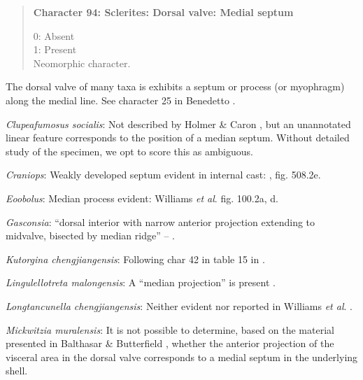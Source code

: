 \documentclass[openany]{book}
\theoremstyle{definition}
\theoremstyle{definition}
\theoremstyle{definition}
\theoremstyle{remark}
\begin{document}
\begin{quote}
\textbf{Character 94: Sclerites: Dorsal valve: Medial septum}

0: Absent\\
1: Present\\
Neomorphic character.
\end{quote}

The dorsal valve of many taxa is exhibits a septum or process (or
myophragm) along the medial line. See character 25 in Benedetto
\citeyearpar{Benedetto2009iChaniella}.

\hypertarget{Clupeafumosus_socialis-coding-94}{}
\emph{Clupeafumosus socialis}: Not described by Holmer \& Caron
\citeyearpar{Holmer2006Aspinose}, but an unannotated linear feature
corresponds to the position of a median septum. Without detailed study
of the specimen, we opt to score this as ambiguous.

\hypertarget{Craniops-coding-94}{}
\emph{Craniops}: Weakly developed septum evident in internal cast:
\citet{Williams2000LinguliformeaCraniiformea}, fig. 508.2e.

\hypertarget{Eoobolus-coding-94}{}
\emph{Eoobolus}: Median process evident: Williams \emph{et al}.
\citeyearpar{Williams2000LinguliformeaCraniiformea} fig. 100.2a, d.

\hypertarget{Gasconsia-coding-94}{}
\emph{Gasconsia}: ``dorsal interior with narrow anterior projection
extending to midvalve, bisected by median ridge'' --
\citet{Williams2000LinguliformeaCraniiformea}.

\hypertarget{Kutorgina_chengjiangensis-coding-94}{}
\emph{Kutorgina chengjiangensis}: Following char 42 in table 15 in
\citet{Williams2000LinguliformeaCraniiformea}.

\hypertarget{Lingulellotreta_malongensis-coding-94}{}
\emph{Lingulellotreta malongensis}: A ``median projection'' is present
\citep[fig. 4g in][]{Balthasar2009Thebrachiopod}.

\hypertarget{Longtancunella_chengjiangensis-coding-94}{}
\emph{Longtancunella chengjiangensis}: Neither evident nor reported in
Williams \emph{et al}.
\citeyearpar{Williams2000LinguliformeaCraniiformea}.

\hypertarget{Mickwitzia_muralensis-coding-94}{}
\emph{Mickwitzia muralensis}: It is not possible to determine, based on
the material presented in Balthasar \& Butterfield
\citeyearpar{Balthasar2009EarlyCambrian}, whether the anterior
projection of the visceral area in the dorsal valve corresponds to a
medial septum in the underlying shell.
\end{document}
